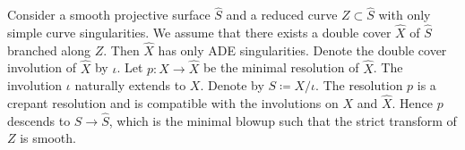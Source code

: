 \documentclass[12pt,reqno,a4paper]{amsart}
\newtheorem{lem}[thm]{Lemma~}
\newtheorem{prop}[thm]{Proposition~}
\newtheorem{cor}[thm]{Corollary~}
\theoremstyle{remark}
\theoremstyle{definition}
\newcommand{\A}{\mathbb{A}}
\newcommand\Bl{\mathrm{Bl}}
\begin{document}




Consider a smooth projective surface $\widehat{S}$ and a reduced curve $Z\subset \widehat{S}$ with only simple curve singularities.
We assume that there exists a double cover $\widehat{X}$ of $\widehat{S}$ branched along $Z$. Then $\widehat{X}$ has only ADE singularities.
Denote the double cover involution of $\widehat{X}$ by $\iota$. 
Let $p\colon X \to \widehat{X}$ be the minimal resolution of $\widehat{X}$.
The involution $\iota$ naturally extends to $X$.
Denote by $S\coloneqq X/\iota$.
The resolution $p$ is a crepant resolution and is compatible with the involutions on $X$ and $\widehat{X}$. Hence $p$ descends to $S\to \widehat{S}$, which is the minimal blowup such that the strict transform of $Z$ is smooth.
\end{document}
